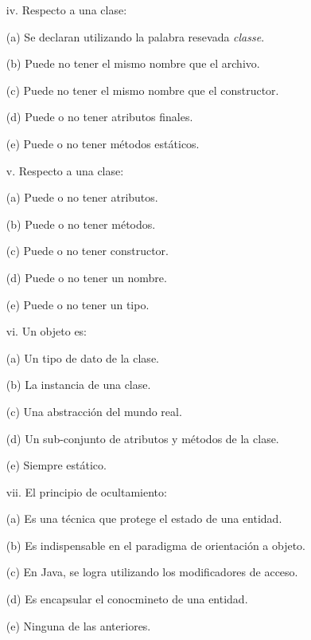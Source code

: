 \documentclass[10pt]{article}
\begin{document}
\begin{enumerate}
{\begin{multicols}{2}
    \begin{enumerate}[label=(\alph*)]
        \item[iv.] Respecto a una clase:
        \item[(a)] Se declaran utilizando la palabra resevada \emph{classe}.
        \item[(b)] Puede no tener el mismo nombre que el archivo.
        \item[(c)] Puede no tener el mismo nombre que el constructor.
        \item[(d)] Puede o no tener atributos finales.
        \item[(e)] Puede o no tener m\'etodos est\'aticos.
    \end{enumerate}

    \begin{enumerate}[label=(\alph*)]
        \item[v.] Respecto a una clase:
        \item[(a)] Puede o no tener atributos.
        \item[(b)] Puede o no tener m\'etodos.
        \item[(c)] Puede o no tener constructor.
        \item[(d)] Puede o no tener un nombre.
        \item[(e)] Puede o no tener un tipo.
    \end{enumerate}

    \begin{enumerate}[label=(\alph*)]
        \item[vi.] Un objeto es:
        \item[(a)] Un tipo de dato de la clase.
        \item[(b)] La instancia de una clase.
        \item[(c)] Una abstracci\'on del mundo real.
        \item[(d)] Un sub-conjunto de atributos y m\'etodos de la clase.
        \item[(e)] Siempre est\'atico.
    \end{enumerate}

    \begin{enumerate}[label=(\alph*)]
        \item[vii.] El principio de ocultamiento:
        \item[(a)] Es una t\'ecnica que protege el estado de una entidad.
        \item[(b)] Es indispensable en el paradigma de orientaci\'on a objeto.
        \item[(c)] En Java, se logra utilizando los modificadores de acceso.
        \item[(d)] Es encapsular el conocmineto de una entidad.
        \item[(e)] Ninguna de las anteriores.
    \end{enumerate}


\end{multicols}}
\end{enumerate}
\end{document}
